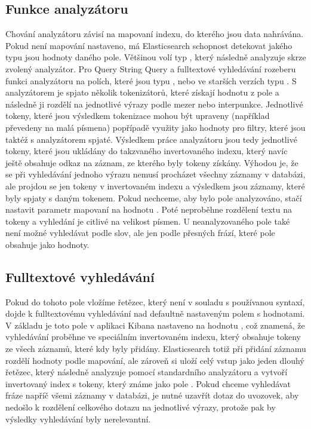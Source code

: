 \documentclass[czech,BP]{thesiskiv}
\begin{document}
\subsection{Funkce analyzátoru}
Chování analyzátoru závisí na mapovaní indexu, do kterého jsou data nahrávána. Pokud není mapování nastaveno, má Elasticsearch schopnost detekovat jakého typu jsou hodnoty daného pole. Většinou volí typ , který následně analyzuje skrze zvolený analyzátor. Pro Query String Query a fulltextové vyhledávání rozeberu funkci analyzátoru na polích, které jsou typu , nebo ve starších verzích typu . S analyzátorem je spjato několik tokenizátorů, které získají hodnotu z pole a následně ji rozdělí na jednotlivé výrazy podle mezer nebo interpunkce. Jednotlivé tokeny, které jsou výsledkem tokenizace mohou být upraveny (například převedeny na malá písmena) popřípadě využity jako hodnoty pro filtry, které jsou taktéž s analyzátorem spjaté. Výsledkem práce analyzátoru jsou tedy jednotlivé tokeny, které jsou ukládány do takzvaného invertovaného indexu, který navíc ještě obsahuje odkaz na záznam, ze kterého byly tokeny získány. Výhodou je, že se při vyhledávání jednoho výrazu nemusí procházet všechny záznamy v databázi, ale projdou se jen tokeny v invertovaném indexu a výsledkem jsou záznamy, které byly spjaty s daným tokenem. Pokud nechceme, aby bylo pole analyzováno, stačí nastavit parametr mapovaní  na hodnotu . Poté neproběhne rozdělení textu na tokeny a vyhledání je citlivé na velikost písmen. U neanalyzovaného pole také není možné vyhledávat podle slov, ale jen podle přesných frází, které pole obsahuje jako hodnoty.

\subsection{Fulltextové vyhledávání}
Pokud do tohoto pole vložíme řetězec, který není v souladu s používanou syntaxí, dojde k fulltextovému vyhledávání nad defaultně nastaveným polem s hodnotami. V základu je toto pole v aplikaci Kibana nastaveno na hodnotu , což znamená, že vyhledávání proběhne ve speciálním invertovaném indexu, který obsahuje tokeny ze všech záznamů, které kdy byly přidány. Elasticsearch totiž při přidání záznamu rozdělí hodnoty podle mapování, ale zároveň si uloží celý vstup jako jeden dlouhý řetězec, který následně analyzuje pomocí standardního analyzátoru a vytvoří invertovaný index s tokeny, který známe jako pole . Pokud chceme vyhledávat fráze napříč všemi záznamy v databázi, je nutné uzavřít dotaz do uvozovek, aby nedošlo k rozdělení celkového dotazu na jednotlivé výrazy, protože pak by výsledky vyhledávání byly nerelevantní.
\end{document}
